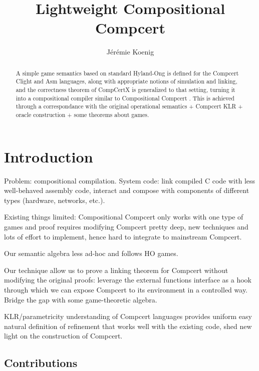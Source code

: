 \documentclass[acmsmall,anonymous,review]{acmart}
\begin{document}
\title{Lightweight Compositional Compcert}

\author{J\'er\'emie Koenig}

\begin{abstract}
A simple game semantics based on standard Hyland-Ong 
is defined for the Compcert Clight and Asm languages,
along with appropriate notions of simulation and linking,
and the correctness theorem of CompCertX \citep{popl15}
is generalized to that setting,
turning it into a compositional compiler
similar to Compositional Compcert \citep{compcomp}.
This is achieved through
a correspondance with the original operational semantics +
Compcert KLR +
oracle construction +
some theorems about games.
\end{abstract}

\maketitle

\section{Introduction} %

Problem:
compositional compilation.
System code:
link compiled C code with less well-behaved assembly code,
interact and compose with components of different types
(hardware, networks, etc.).

Existing things limited:
Compositional Compcert only works with one type of games
and proof requires modifying Compcert pretty deep,
new techniques and lots of effort to implement,
hence hard to integrate to mainstream Compcert.

Our semantic algebra less ad-hoc and follows HO games.

Our technique allow us to prove a linking theorem for Compcert
without modifying the original proofs:
leverage the external functions interface as a hook
through which we can expose Compcert to its environment in a controlled way.
Bridge the gap with some game-theoretic algebra.

KLR/parametricity understanding of Compcert languages provides
uniform easy natural definition of refinement
that works well with the existing code,
shed new light on the construction of Compcert.

\subsection{Contributions}
\end{document}
